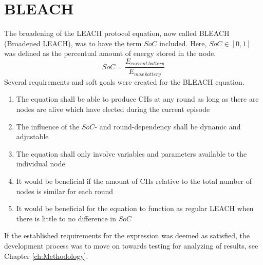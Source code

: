 \section{BLEACH}
The broadening of the LEACH protocol equation, now called BLEACH (Broadened LEACH), was to have the term $SoC$ included. Here, $SoC\in[0,1]$ was defined as the percentual amount of energy stored in the node.
\begin{equation}
    SoC = \frac{E_{current\:battery}}{E_{max\:battery}}
\end{equation}
Several requirements and soft goals were created for the BLEACH equation.
\begin{enumerate}
    \item The equation shall be able to produce CHs at any round as long as there are nodes are alive which have elected during the current episode
    \item The influence of the $SoC$- and round-dependency shall be dynamic and adjustable
    \item The equation shall only involve variables and parameters available to the individual node
    \item It would be beneficial if the amount of CHs relative to the total number of nodes is similar for each round
    \item It would be beneficial for the equation to function as regular LEACH when there is little to no difference in $SoC$
\end{enumerate}
\noindent If the established requirements for the expression was deemed as satisfied, the development process was to move on towards testing for analyzing of results, see Chapter \ref{ch:Methodology}.

